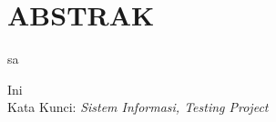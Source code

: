 
\chapter*{ABSTRAK}
\noindent sa

\begin{singlespace}
    \begin{justify}
        Ini\\[2cm]
        Kata Kunci: \textit{Sistem Informasi, Testing Project}
    \end{justify}

\end{singlespace}

\newpage